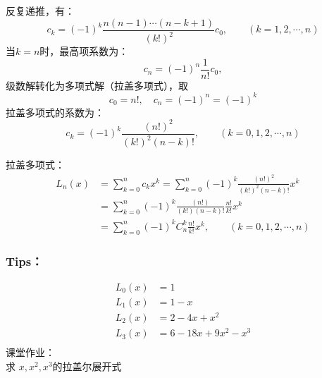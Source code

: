 \begin{frame}
	反复递推，有：
	\begin{equation*}
		c_{k}=(-1)^k \frac{n(n-1)\cdots (n-k+1)}{(k!)^2} c_0, \qquad (k=1,2,\cdots, n)
	\end{equation*}	
	当$k=n$时，最高项系数为：
	\begin{equation*}
		c_{n}=(-1)^n \frac{1}{n!} c_0, 
	\end{equation*}	
	级数解转化为多项式解（拉盖多项式），取
	\begin{equation*}
		c_{0}=n!, \quad  c_{n}=(-1)^n = (-1)^k 
	\end{equation*}	
	拉盖多项式的系数为：
	\begin{equation*}
		c_{k}=(-1)^k \frac{(n!) ^2}{(k!)^2 (n-k)!},  \qquad (k=0,1,2,\cdots, n)
	\end{equation*}	
\end{frame}	

\begin{frame}
	拉盖多项式：
	\begin{equation*}
	\begin{split}
		L_n(x) &=\sum_{k=0}^{n} c_{k} x^k= \sum_{k=0}^{n} (-1)^k \frac{(n!)^2 }{(k!)^2 (n-k)!}x^k \\
		&= \sum_{k=0}^{n} (-1)^k \frac{(n!) }{(k!) (n-k)!} \frac{n!}{k!}x^k   \\
		&= \sum_{k=0}^{n} (-1)^k C^k _n \frac{n!}{k!}x^k,    \qquad (k=0,1,2,\cdots, n)
	\end{split}		
	\end{equation*}	
\end{frame}	

\begin{frame}
	\frametitle{Tips：}
	\begin{equation*}
	\begin{split}
		L_0(x)&=1\\
		L_1(x)&=1-x\\
		L_2(x)&=2-4x+x^2\\
		L_3(x)&=6-18x+9x^2-x^3\\
	\end{split}		
	\end{equation*}	
	课堂作业：\\
	求 $x, x^2, x^3 $的拉盖尔展开式
\end{frame}	


